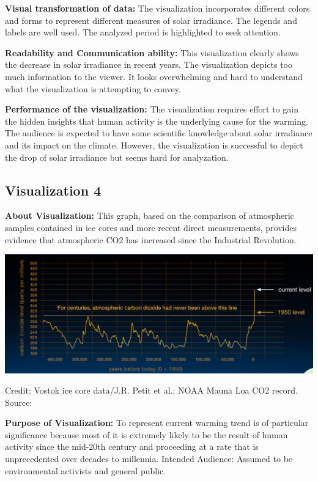 \documentclass[]{book}
\begin{document}
\textbf{Visual transformation of data:} The visualization incorporates different colors and forms to represent different measures of solar irradiance. The legends and labels are well used. The analyzed period is highlighted to seek attention.

\textbf{Readability and Communication ability:} This visualization clearly shows the decrease in solar irradiance in recent years. The visualization depicts too much information to the viewer. It looks overwhelming and hard to understand what the visualization is attempting to convey.

\textbf{Performance of the visualization:} The visualization requires effort to gain the hidden insights that human activity is the underlying cause for the warming. The audience is expected to have some scientific knowledge about solar irradiance and its impact on the climate. However, the visualization is successful to depict the drop of solar irradiance but seems hard for analyzation.

\hypertarget{visualization-4}{%
\subsection{Visualization 4}\label{visualization-4}}

\textbf{About Visualization:} This graph, based on the comparison of atmospheric samples contained in ice cores and more recent direct measurements, provides evidence that atmospheric CO2 has increased since the Industrial Revolution.

\includegraphics{images/Vz6-Co2.png}

Credit: Vostok ice core data/J.R. Petit et al.; NOAA Mauna Loa CO2 record.
Source:\citep{Co2}

\textbf{Purpose of Visualization:} To represent current warming trend is of particular significance because most of it is extremely likely to be the result of human activity since the mid-20th century and proceeding at a rate that is unprecedented over decades to millennia.
Intended Audience: Assumed to be environmental activists and general public.
\end{document}
